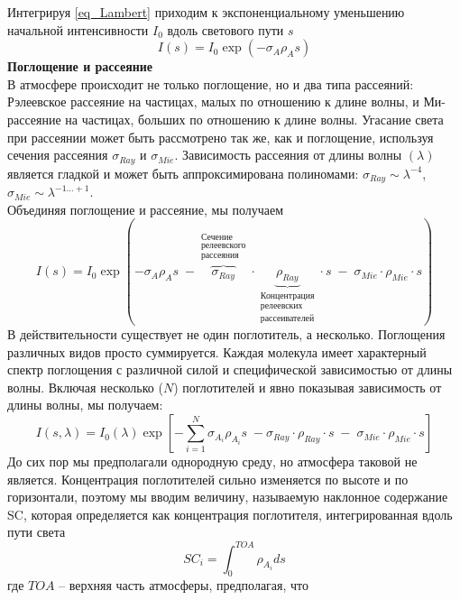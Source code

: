 \documentclass[a4paper,14pt]{article}
\theoremstyle{plain}
\theoremstyle{definition}
\theoremstyle{remark}
\newcommand{\nl}{\\ \indent}
\begin{document}
Интегрируя \eqref{eq_Lambert} приходим к экспоненциальному
уменьшению начальной интенсивности $I_{0}$ вдоль светового пути
$s$
\begin{equation}
I(s) = I_0 \exp(-\sigma_A \rho_A s)
\end{equation}
\textbf{Поглощение и рассеяние}
\nl
В атмосфере происходит не только поглощение, но и два типа
рассеяний: Рэлеевское рассеяние на частицах, 
малых по отношению к длине волны, и Ми-рассеяние на частицах, больших по отношению к длине волны.
Угасание света при рассеянии может быть рассмотрено так же, 
как и поглощение, используя сечения рассеяния $\sigma_{Ray}$ 
и $\sigma_{Mie}$. 
Зависимость рассеяния от длины волны $(\lambda)$ является 
гладкой и может быть аппроксимирована
полиномами: $\sigma_{Ray} \sim \lambda^{-4}$,
$\sigma_{Mie} \sim \lambda^{-1 \ldots +1}$.
\nl
Объединяя поглощение и рассеяние, мы получаем
\begin{equation}
I(s) =
I_0 \exp(
-\sigma_A \rho_A s \;
- \overbrace{\sigma_{Ray}}^{\substack{
\text{Сечение} \\ 
\text{релеевского} \\
\text{рассеяния}
}} \cdot
\underbrace{\rho_{Ray}}_{\substack{
\text{Концентрация} \\ 
\text{релеевских} \\ 
\text{рассеивателей}}} \cdot
s \;
- \;
\sigma_{Mie} \cdot \rho_{Mie} \cdot s
)
\end{equation}
В действительности существует не один поглотитель, а несколько.
Поглощения различных видов просто суммируется. 
Каждая молекула имеет характерный спектр поглощения с 
различной силой и специфической зависимостью от длины волны.
Включая несколько ($N$) поглотителей и явно показывая 
зависимость от длины волны, мы получаем:
\begin{equation}
I(s, \lambda) =
I_0(\lambda) \exp 
\left[
-\sum_{i=1}^N\sigma_{A_i} \rho_{A_i} s \;
- \sigma_{Ray} \cdot
\rho_{Ray} \cdot
s \;
- \;
\sigma_{Mie} \cdot \rho_{Mie} \cdot s 
\right]
\label{eq_sc}
\end{equation}
До сих пор мы предполагали однородную среду, но атмосфера 
таковой не является. 
Концентрация поглотителей сильно изменяется по высоте и по
горизонтали, поэтому мы вводим величину, называемую 
наклонное содержание $\text{SC}$, которая определяется 
как концентрация поглотителя, интегрированная вдоль пути света
\begin{equation}
SC_i = 
\int_{0}^{TOA}
\rho_{A_i} ds
\end{equation}
где $TOA$ -- верхняя часть атмосферы, предполагая, что 
\end{document}
